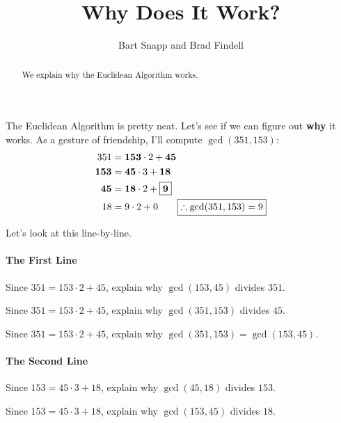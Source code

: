 \documentclass[nooutcomes]{ximera}
\title{Why Does It Work?}
\author{Bart Snapp and Brad Findell}
\begin{document}
\begin{abstract}
  We explain why the Euclidean Algorithm works.
\end{abstract}
\maketitle

\label{A:GCDwork}

The Euclidean Algorithm is pretty
neat. Let's see if we can figure out \textbf{why} it works. As a gesture of friendship, I'll compute $\gcd(351,153)$:
\begin{align*}
351 &= \boldsymbol{153}\cdot 2 + \boldsymbol{45}\\ 
\boldsymbol{153} &= \boldsymbol{45}\cdot 3 + \boldsymbol{18}\\
\boldsymbol{45} &= \boldsymbol{18}\cdot 2 + \fbox{$\boldsymbol{9}$}\\
18 &= 9\cdot 2 + 0 \qquad \fbox{$\therefore \gcd(351,153) = 9$}
\end{align*}

Let's look at this line-by-line.

\paragraph{The First Line}
\begin{problem}
Since $351 = 153\cdot 2 + 45$, explain why $\gcd(153,45)$ divides $351$.
\end{problem}

\begin{problem}
Since $351 = 153\cdot 2 + 45$, explain why $\gcd(351,153)$ divides $45$.
\end{problem}

\begin{problem}
Since $351 = 153\cdot 2 + 45$, explain why $\gcd(351,153) = \gcd(153,45)$.
\end{problem}


\paragraph{The Second Line}
\begin{problem}
Since $153 = 45\cdot 3 + 18$, explain why $\gcd(45,18)$ divides $153$.
\end{problem}

\begin{problem}
Since $153 = 45\cdot 3 + 18$, explain why $\gcd(153,45)$ divides $18$.
\end{problem}
\end{document}
